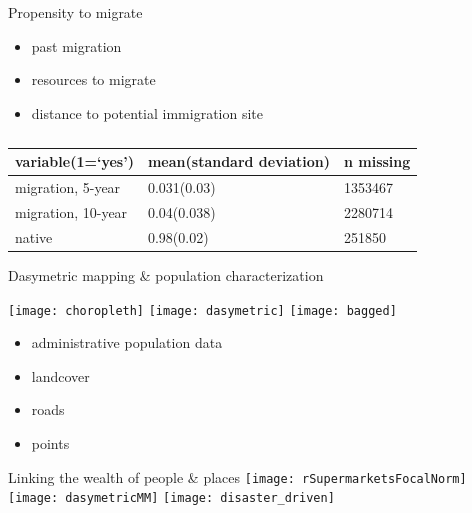 \documentclass{beamer}
\begin{document}
\begin{frame}{Propensity to migrate}
  \begin{itemize}
  \item past migration
  \item resources to migrate
  \item distance to potential immigration site
  \end{itemize}
  \begin{table}

  \begin{tabular}{l l l}
    \hline
    variable(1=`yes')  & mean(standard deviation) & n missing \\
    \hline
    migration, 5-year  & 0.031(0.03) & 1353467 \\
    migration, 10-year & 0.04(0.038) & 2280714 \\
    native             & 0.98(0.02) & 251850 \\
    \hline
   \end{tabular}

  \caption{\cite{ipums}}
  \end{table}

\end{frame}


\begin{frame}{Dasymetric mapping \& population characterization}
  \begin{center}
    \texttt{[image: choropleth]}%
    \texttt{[image: dasymetric]}%
    \texttt{[image: bagged]}
  \end{center}
  \begin{itemize}
  \item administrative population data
  \item landcover
  \item roads
  \item points
  \end{itemize}
\end{frame}


\begin{frame}{Linking the wealth of people \& places}
  \texttt{[image: rSupermarketsFocalNorm]}%
  \texttt{[image: dasymetricMM]}%
  \texttt{[image: disaster\_driven]}
\end{frame}

\end{document}
